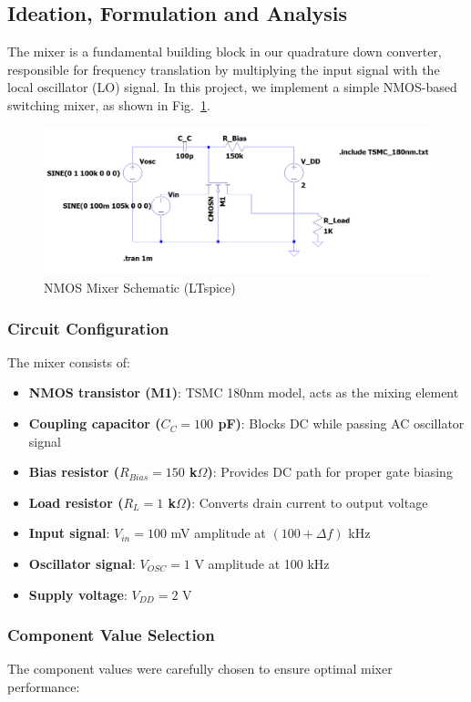 \subsection{Ideation, Formulation and Analysis}

The mixer is a fundamental building block in our quadrature down converter, responsible for frequency translation by multiplying the input signal with the local oscillator (LO) signal. In this project, we implement a simple NMOS-based switching mixer, as shown in Fig.~\ref{fig:nmos_mixer}.

\begin{figure}[H]
    \centering
    \includegraphics[width=\linewidth]{fig/mixer.png}
    \caption{NMOS Mixer Schematic (LTspice)}
    \label{fig:nmos_mixer}
\end{figure}

\subsubsection{Circuit Configuration}
The mixer consists of:
\begin{itemize}
    \item \textbf{NMOS transistor (M1)}: TSMC 180nm model, acts as the mixing element
    \item \textbf{Coupling capacitor ($C_C = 100$ pF)}: Blocks DC while passing AC oscillator signal
    \item \textbf{Bias resistor ($R_{Bias} = 150$ k$\Omega$)}: Provides DC path for proper gate biasing
    \item \textbf{Load resistor ($R_L = 1$ k$\Omega$)}: Converts drain current to output voltage
    \item \textbf{Input signal}: $V_{in} = 100$ mV amplitude at $(100 + \Delta f)$ kHz
    \item \textbf{Oscillator signal}: $V_{OSC} = 1$ V amplitude at 100 kHz
    \item \textbf{Supply voltage}: $V_{DD} = 2$ V
\end{itemize}
\subsubsection{Component Value Selection}
The component values were carefully chosen to ensure optimal mixer performance:

